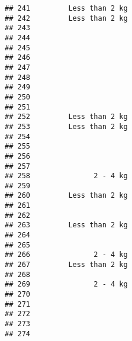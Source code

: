 \documentclass[
]{article}
\begin{document}
\begin{verbatim}
## 241         Less than 2 kg                                               
## 242         Less than 2 kg                                               
## 243                                                                      
## 244                                                                      
## 245                                                                      
## 246                                                                      
## 247                                                                      
## 248                                                                      
## 249                                                                      
## 250                                                                      
## 251                                                                      
## 252         Less than 2 kg                                               
## 253         Less than 2 kg                                               
## 254                                                                      
## 255                                                                      
## 256                                                                      
## 257                                                                      
## 258               2 - 4 kg                                               
## 259                                                                      
## 260         Less than 2 kg                                               
## 261                                                                      
## 262                                                                      
## 263         Less than 2 kg                                               
## 264                                                                      
## 265                                                                      
## 266               2 - 4 kg                                               
## 267         Less than 2 kg                                               
## 268                                                                      
## 269               2 - 4 kg                                               
## 270                                                                      
## 271                                                                      
## 272                                                                      
## 273                                                                      
## 274                                                                      

\end{verbatim}
\end{document}
